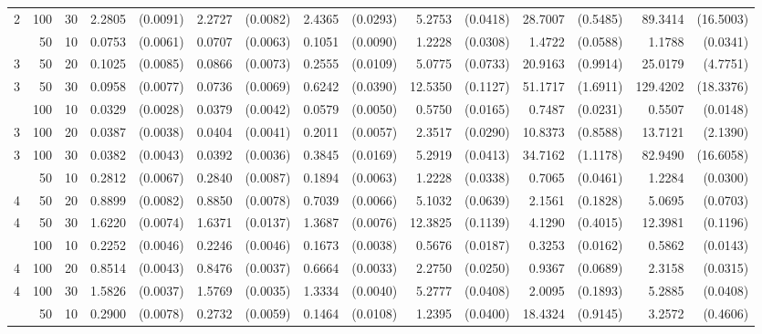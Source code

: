 \begin{table}[ht]
\begin{small}
\begin{tabular}{lrr|rr|rr|rr|rr|rr|rr}
  2 & 100 & 30 & 2.2805 & (0.0091) & 2.2727 & (0.0082) & 2.4365 & (0.0293) & 5.2753 & (0.0418) & 28.7007 & (0.5485) & 89.3414 & (16.5003) \\ 
\hdashline
\hdashline
  3 & 50 & 10 & 0.0753 & (0.0061) & 0.0707 & (0.0063) & 0.1051 & (0.0090) & 1.2228 & (0.0308) & 1.4722 & (0.0588) & 1.1788 & (0.0341) \\ 
  3 & 50 & 20 & 0.1025 & (0.0085) & 0.0866 & (0.0073) & 0.2555 & (0.0109) & 5.0775 & (0.0733) & 20.9163 & (0.9914) & 25.0179 & (4.7751) \\ 
  3 & 50 & 30 & 0.0958 & (0.0077) & 0.0736 & (0.0069) & 0.6242 & (0.0390) & 12.5350 & (0.1127) & 51.1717 & (1.6911) & 129.4202 & (18.3376) \\ 
\hdashline
  3 & 100 & 10 & 0.0329 & (0.0028) & 0.0379 & (0.0042) & 0.0579 & (0.0050) & 0.5750 & (0.0165) & 0.7487 & (0.0231) & 0.5507 & (0.0148) \\ 
  3 & 100 & 20 & 0.0387 & (0.0038) & 0.0404 & (0.0041) & 0.2011 & (0.0057) & 2.3517 & (0.0290) & 10.8373 & (0.8588) & 13.7121 & (2.1390) \\ 
  3 & 100 & 30 & 0.0382 & (0.0043) & 0.0392 & (0.0036) & 0.3845 & (0.0169) & 5.2919 & (0.0413) & 34.7162 & (1.1178) & 82.9490 & (16.6058) \\ 
\hdashline
\hdashline
  4 & 50 & 10 & 0.2812 & (0.0067) & 0.2840 & (0.0087) & 0.1894 & (0.0063) & 1.2228 & (0.0338) & 0.7065 & (0.0461) & 1.2284 & (0.0300) \\ 
  4 & 50 & 20 & 0.8899 & (0.0082) & 0.8850 & (0.0078) & 0.7039 & (0.0066) & 5.1032 & (0.0639) & 2.1561 & (0.1828) & 5.0695 & (0.0703) \\ 
  4 & 50 & 30 & 1.6220 & (0.0074) & 1.6371 & (0.0137) & 1.3687 & (0.0076) & 12.3825 & (0.1139) & 4.1290 & (0.4015) & 12.3981 & (0.1196) \\ 
\hdashline
  4 & 100 & 10 & 0.2252 & (0.0046) & 0.2246 & (0.0046) & 0.1673 & (0.0038) & 0.5676 & (0.0187) & 0.3253 & (0.0162) & 0.5862 & (0.0143) \\ 
  4 & 100 & 20 & 0.8514 & (0.0043) & 0.8476 & (0.0037) & 0.6664 & (0.0033) & 2.2750 & (0.0250) & 0.9367 & (0.0689) & 2.3158 & (0.0315) \\ 
  4 & 100 & 30 & 1.5826 & (0.0037) & 1.5769 & (0.0035) & 1.3334 & (0.0040) & 5.2777 & (0.0408) & 2.0095 & (0.1893) & 5.2885 & (0.0408) \\ 
\hdashline
\hdashline
  5 & 50 & 10 & 0.2900 & (0.0078) & 0.2732 & (0.0059) & 0.1464 & (0.0108) & 1.2395 & (0.0400) & 18.4324 & (0.9145) & 3.2572 & (0.4606) \\ 

\end{tabular}
\end{small}
\end{table}
